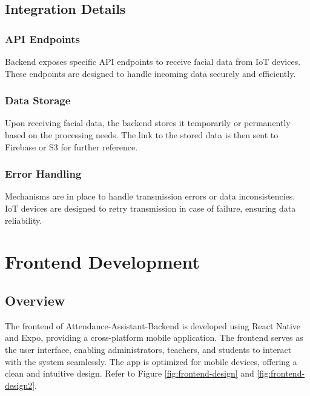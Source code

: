 \documentclass[conference]{IEEEtran}
\begin{document}
\subsection{Integration Details}
\subsubsection{API Endpoints}
Backend exposes specific API endpoints to receive facial data from IoT devices. These endpoints are designed to handle incoming data securely and efficiently.

\subsubsection{Data Storage}
Upon receiving facial data, the backend stores it temporarily or permanently based on the processing needs. The link to the stored data is then sent to Firebase or S3 for further reference.

\subsubsection{Error Handling}
Mechanisms are in place to handle transmission errors or data inconsistencies. IoT devices are designed to retry transmission in case of failure, ensuring data reliability.

\section{Frontend Development}
\subsection{Overview}
The frontend of Attendance-Assistant-Backend is developed using React Native and Expo, providing a cross-platform mobile application. The frontend serves as the user interface, enabling administrators, teachers, and students to interact with the system seamlessly. The app is optimized for mobile devices, offering a clean and intuitive design. Refer to Figure \ref{fig:frontend-design} and \ref{fig:frontend-design2}.
\end{document}
